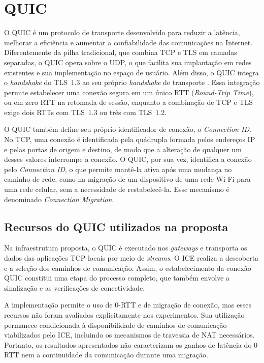 \chapter{QUIC}
\label{chap:quic}

O QUIC \citep{rfc8999, rfc9000} é um protocolo de transporte desenvolvido para reduzir a latência, melhorar a eficiência e aumentar a confiabilidade das comunicações na Internet. Diferentemente da pilha tradicional, que combina TCP e TLS em camadas separadas, o QUIC opera sobre o UDP, o que facilita sua implantação em redes existentes e sua implementação no espaço de usuário. Além disso, o QUIC integra o \textit{handshake} do TLS~1.3 ao seu próprio \textit{handshake} de transporte \citep{rfc9001}. Essa integração permite estabelecer uma conexão segura em um único RTT (\textit{Round-Trip Time}), ou em zero RTT na retomada de sessão, enquanto a combinação de TCP e TLS exige dois RTTs com TLS~1.3 ou três com TLS~1.2.

O QUIC também define seu próprio identificador de conexão, o \textit{Connection ID}. No TCP, uma conexão é identificada pela quádrupla formada pelos endereços IP e pelas portas de origem e destino, de modo que a alteração de qualquer um desses valores interrompe a conexão. O QUIC, por sua vez, identifica a conexão pelo \textit{Connection ID}, o que permite mantê-la ativa após uma mudança no caminho de rede, como na migração de um dispositivo de uma rede Wi-Fi para uma rede celular, sem a necessidade de restabelecê-la. Esse mecanismo é denominado \textit{Connection Migration}.

\section{Recursos do QUIC utilizados na proposta}

Na infraestrutura proposta, o QUIC é executado nos \textit{gateways} e transporta os dados das aplicações TCP locais por meio de \textit{streams}. O ICE realiza a descoberta e a seleção dos caminhos de comunicação. Assim, o estabelecimento da conexão QUIC constitui uma etapa do processo completo, que também envolve a sinalização e as verificações de conectividade.

A implementação permite o uso de 0-RTT e de migração de conexão, mas esses recursos não foram avaliados explicitamente nos experimentos. Sua utilização permanece condicionada à disponibilidade de caminhos de comunicação viabilizados pelo ICE, incluindo os mecanismos de travessia de NAT necessários. Portanto, os resultados apresentados não caracterizam os ganhos de latência do 0-RTT nem a continuidade da comunicação durante uma migração.

